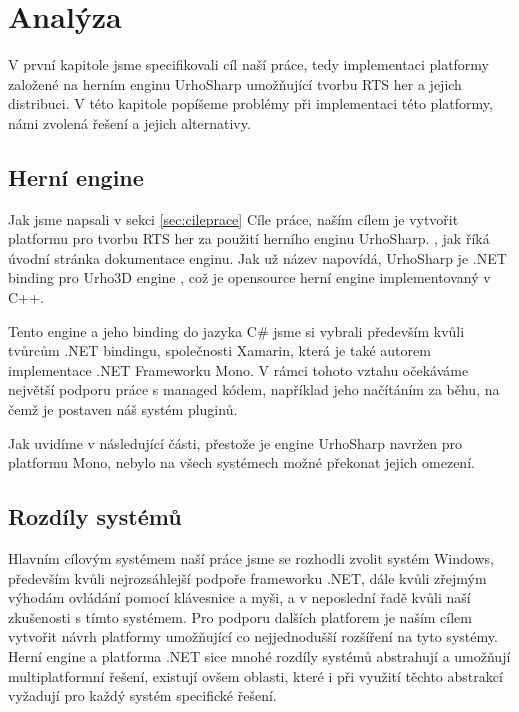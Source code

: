 \chapter{Analýza}
V první kapitole jsme specifikovali cíl naší práce, tedy implementaci platformy založené na herním enginu UrhoSharp umožňující tvorbu RTS her a jejich distribuci. V této kapitole popíšeme problémy při implementaci této platformy, námi zvolená řešení a jejich alternativy.

\section{Herní engine}
Jak jsme napsali v sekci \ref{sec:cileprace} Cíle práce, naším cílem je vytvořit platformu pro tvorbu RTS her za použití herního enginu UrhoSharp. \textit{ } \citep{site:urhosharp}, jak říká úvodní stránka dokumentace enginu. Jak už název napovídá, UrhoSharp je .NET binding pro Urho3D engine \citep{site:urho3D}, což je opensource herní engine implementovaný v C++.

Tento engine a jeho binding do jazyka C\# jsme si vybrali především kvůli tvůrcům .NET bindingu, společnosti Xamarin, která je také autorem implementace .NET Frameworku Mono. V rámci tohoto vztahu očekáváme největší podporu práce s managed kódem, například jeho načítáním za běhu, na čemž je postaven náš systém pluginů. 

Jak uvidíme v následující části, přestože je engine UrhoSharp navržen pro platformu Mono, nebylo na všech systémech možné překonat jejich omezení.

\section{Rozdíly systémů}
\label{sec:system_dif}
Hlavním cílovým systémem naší práce jsme se rozhodli zvolit systém Windows, především kvůli nejrozsáhlejší podpoře frameworku .NET, dále kvůli zřejmým výhodám ovládání pomocí klávesnice a myši, a v neposlední řadě kvůli naší zkušenosti s tímto systémem. Pro podporu dalších platforem je naším cílem vytvořit návrh platformy umožňující co nejjednodušší rozšíření na tyto systémy. Herní engine a platforma .NET sice mnohé rozdíly systémů abstrahují a umožňují multiplatformní řešení, existují ovšem oblasti, které i při využití těchto abstrakcí vyžadují pro každý systém specifické řešení.  

